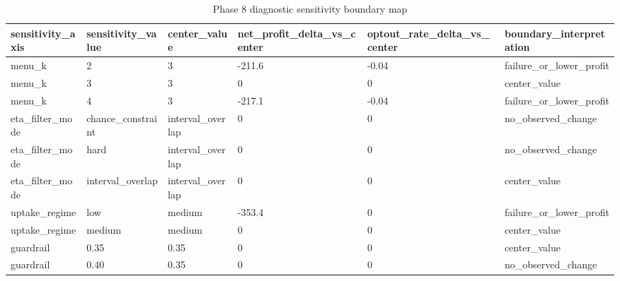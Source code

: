 \begin{table}[ht]
\centering
\begin{tabular}{llllll}
 \hline
sensitivity\_axis & sensitivity\_value & center\_value & net\_profit\_delta\_vs\_center & optout\_rate\_delta\_vs\_center & boundary\_interpretation \\
 \hline
menu\_k & 2 & 3 & -211.6 & -0.04 & failure\_or\_lower\_profit \\
menu\_k & 3 & 3 & 0 & 0 & center\_value \\
menu\_k & 4 & 3 & -217.1 & -0.04 & failure\_or\_lower\_profit \\
eta\_filter\_mode & chance\_constraint & interval\_overlap & 0 & 0 & no\_observed\_change \\
eta\_filter\_mode & hard & interval\_overlap & 0 & 0 & no\_observed\_change \\
eta\_filter\_mode & interval\_overlap & interval\_overlap & 0 & 0 & center\_value \\
uptake\_regime & low & medium & -353.4 & 0 & failure\_or\_lower\_profit \\
uptake\_regime & medium & medium & 0 & 0 & center\_value \\
guardrail & 0.35 & 0.35 & 0 & 0 & center\_value \\
guardrail & 0.40 & 0.35 & 0 & 0 & no\_observed\_change \\
 \hline
\end{tabular}
\caption{Phase 8 diagnostic sensitivity boundary map}
\end{table}

